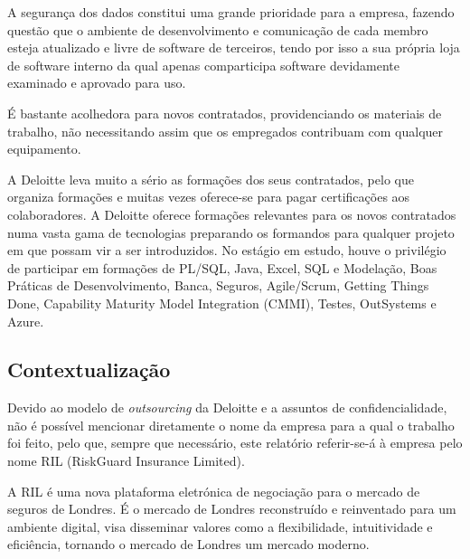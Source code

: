         A segurança dos dados constitui uma grande prioridade para a empresa, fazendo questão que o ambiente de desenvolvimento e comunicação de cada membro esteja atualizado e livre de software de terceiros, tendo por isso a sua própria loja de software interno da qual apenas comparticipa software devidamente examinado e aprovado para uso.
    
        É bastante acolhedora para novos contratados, providenciando os materiais de trabalho, não necessitando assim que os empregados contribuam com qualquer equipamento.
        
        A Deloitte leva muito a sério as formações dos seus contratados, pelo que organiza formações e muitas vezes oferece-se para pagar certificações aos colaboradores. A Deloitte oferece formações relevantes para os novos contratados numa vasta gama de tecnologias preparando os formandos para qualquer projeto em que possam vir a ser introduzidos. No estágio em estudo, houve o privilégio de participar em formações de PL/SQL, Java, Excel, SQL e Modelação, Boas Práticas de Desenvolvimento, Banca, Seguros, Agile/Scrum, Getting Things Done, Capability Maturity Model Integration (CMMI), Testes, OutSystems e Azure.
    
    \subsection{Contextualização}\label{subsec:contextualizacao}

        Devido ao modelo de \textit{outsourcing} da Deloitte e a assuntos de confidencialidade, não é possível mencionar diretamente o nome da empresa para a qual o trabalho foi feito, pelo que, sempre que necessário, este relatório referir-se-á à empresa pelo nome RIL (RiskGuard Insurance Limited).
    
        A RIL é uma nova plataforma eletrónica de negociação para o mercado de seguros de Londres. É o mercado de Londres reconstruído e reinventado para um ambiente digital, visa disseminar valores como a flexibilidade, intuitividade e eficiência, tornando o mercado de Londres um mercado moderno.

